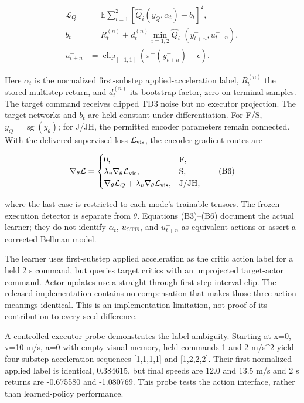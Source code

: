 \documentclass[letterpaper,journal,onecolumn]{IEEEtran}
\begin{document}
\[\begin{aligned}
\mathcal L_Q&=\mathbb E\sum_{i=1}^2\left[\widehat Q_i(y_Q,\alpha_t)-b_t\right]^2,\\
b_t&=R_t^{(n)}+d_t^{(n)}\min_{i=1,2}\widehat Q_i^{-}(y_{t+n}^{-},u_{t+n}^{-}),\\
u_{t+n}^{-}&=\operatorname{clip}_{[-1,1]}(\pi^{-}(y_{t+n}^{-})+\epsilon).
\end{aligned}\tag{B5}\]

Here \(\alpha_t\) is the normalized first-substep applied-acceleration label, \(R_t^{(n)}\) the stored multistep return, and \(d_t^{(n)}\) its bootstrap factor, zero on terminal samples. The target command receives clipped TD3 noise but no executor projection. The target networks and \(b_t\) are held constant under differentiation. For F/S, \(y_Q=\operatorname{sg}(y_\theta)\); for J/JH, the permitted encoder parameters remain connected. With the delivered supervised loss \(\mathcal L_{\rm vis}\), the encoder-gradient routes are

\[\nabla_\theta\mathcal L=\begin{cases}
0,&\mathrm{F},\\
\lambda_v\nabla_\theta\mathcal L_{\rm vis},&\mathrm{S},\\
\nabla_\theta\mathcal L_Q+\lambda_v\nabla_\theta\mathcal L_{\rm vis},&\mathrm{J/JH},
\end{cases}\tag{B6}\]

where the last case is restricted to each mode's trainable tensors. The frozen execution detector is separate from \(\theta\). Equations (B3)--(B6) document the actual learner; they do not identify \(\alpha_t\), \(u_{\rm STE}\), and \(u^-_{t+n}\) as equivalent actions or assert a corrected Bellman model.

The learner uses first-substep applied acceleration as the critic action label for a held 2 s command, but queries target critics with an unprojected target-actor command. Actor updates use a straight-through first-step interval clip. The released implementation contains no compensation that makes those three action meanings identical. This is an implementation limitation, not proof of its contribution to every seed difference.

A controlled executor probe demonstrates the label ambiguity. Starting at x=0, v=10 m/s, a=0 with empty visual memory, held commands 1 and 2 m/s\^{}2 yield four-substep acceleration sequences {[}1,1,1,1{]} and {[}1,2,2,2{]}. Their first normalized applied label is identical, 0.384615, but final speeds are 12.0 and 13.5 m/s and 2 s returns are -0.675580 and -1.080769. This probe tests the action interface, rather than learned-policy performance.
\end{document}
